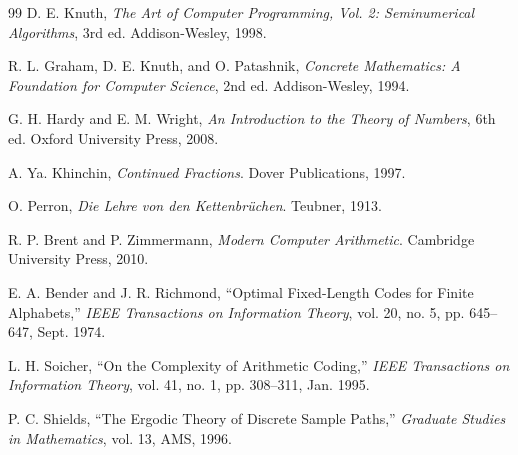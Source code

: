 \documentclass[10pt, onecolumn]{IEEEtran}
\begin{document}
\begin{thebibliography}{99}
D. E. Knuth, \textit{The Art of Computer Programming, Vol. 2: Seminumerical Algorithms}, 3rd ed. Addison-Wesley, 1998.

R. L. Graham, D. E. Knuth, and O. Patashnik, \textit{Concrete Mathematics: A Foundation for Computer Science}, 2nd ed. Addison-Wesley, 1994.

G. H. Hardy and E. M. Wright, \textit{An Introduction to the Theory of Numbers}, 6th ed. Oxford University Press, 2008.

A. Ya. Khinchin, \textit{Continued Fractions}. Dover Publications, 1997.

O. Perron, \textit{Die Lehre von den Kettenbr\"uchen}. Teubner, 1913.

R. P. Brent and P. Zimmermann, \textit{Modern Computer Arithmetic}. Cambridge University Press, 2010.

E. A. Bender and J. R. Richmond, ``Optimal Fixed-Length Codes for Finite Alphabets,'' \textit{IEEE Transactions on Information Theory}, vol. 20, no. 5, pp. 645--647, Sept. 1974.

L. H. Soicher, ``On the Complexity of Arithmetic Coding,'' \textit{IEEE Transactions on Information Theory}, vol. 41, no. 1, pp. 308--311, Jan. 1995.

P. C. Shields, ``The Ergodic Theory of Discrete Sample Paths,'' \textit{Graduate Studies in Mathematics}, vol. 13, AMS, 1996.

\end{thebibliography}
\end{document}
